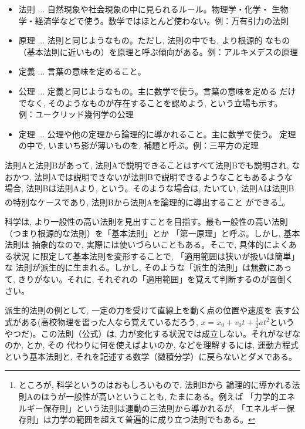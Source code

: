 \begin{itemize}
\item 法則 ... 自然現象や社会現象の中に見られるルール。物理学・化学・
生物学・経済学などで使う。数学ではほとんど使わない。例：万有引力の法則
\vspace{0.1cm}
\item 原理 ... 法則と同じようなもの。ただし, 法則の中でも, より根源的
なもの（基本法則に近いもの）を原理と呼ぶ傾向がある。例：アルキメデスの原理
\vspace{0.1cm}
\item 定義 ... 言葉の意味を定めること。
\vspace{0.1cm}
\item 公理 ... 定義と同じようなもの。主に数学で使う。言葉の意味を定める
だけでなく, そのようなものが存在することを認めよう, という立場も示す。
例：ユークリッド幾何学の公理
\vspace{0.1cm}
\item 定理 ... 公理や他の定理から論理的に導かれること。主に数学で使う。
定理の中で, いまいち影が薄いものを, 補題と呼ぶ。例：三平方の定理
\end{itemize}

法則Aと法則Bがあって, 法則Aで説明できることはすべて法則Bでも説明され, 
なおかつ, 法則Aでは説明できないが法則Bで説明できるようなこともあるような
場合, 法則Bは法則Aより, という。そのような場合は, たいてい, 
法則Aは法則Bの特別なケースであり, 法則Bから法則Aを論理的に導出すること
ができる\footnote{ところが, 科学というのはおもしろいもので, 法則Bから
論理的に導かれる法則Aのほうが一般性が高いということも, たまにある。例えば
「力学的エネルギー保存則」という法則は運動の三法則から導かれるが, 
「エネルギー保存則」は力学の範囲を超えて普遍的に成り立つ法則でもある。}。

科学は, より一般性の高い法則を見出すことを目指す。最も一般性の高い法則
（つまり根源的な法則）を「基本法則」とか
「第一原理」と呼ぶ。しかし, 基本法則は
抽象的なので, 実際には使いづらいこともある。そこで, 具体的によくある状況
に限定して基本法則を変形することで, 「適用範囲は狭いが扱いは簡単」な
法則が派生的に生まれる。しかし, そのような「派生的法則」は無数にあって, 
きりがない。それに, それぞれの「適用範囲」を覚えて判断するのが面倒くさい。

派生的法則の例として, 一定の力を受けて直線上を動く点の位置や速度を
表す公式がある(高校物理を習った人なら覚えているだろう, 
$x=x_0+v_0t+\frac{1}{2}at^2$というやつだ)。この法則（公式）は, 
力が変化する状況では成立しない。それがなぜなのか, とか, その
代わりに何を使えばよいのか, などを理解するには, 運動方程式
という基本法則と, それを記述する数学（微積分学）に戻らないとダメである。

